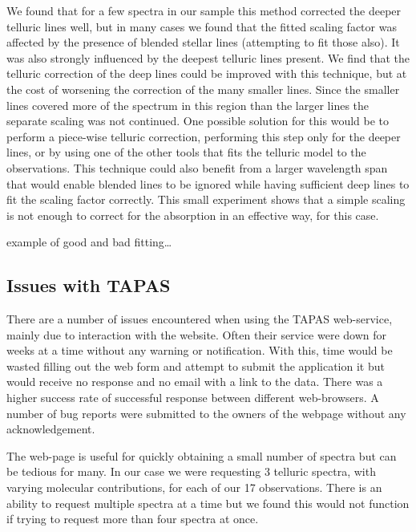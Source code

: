 We found that for a few spectra in our sample this method corrected the deeper telluric lines well, but in many cases we found that the fitted scaling factor was affected by the presence of blended stellar lines (attempting to fit those also).
It was also strongly influenced by the deepest   telluric lines present.
We find that the telluric correction of the deep  lines could be improved with this technique, but at the cost of worsening the correction of the many smaller  lines.
Since the smaller  lines covered more of the spectrum in this region than the larger lines the separate  scaling was not continued.
One possible solution for this would be to perform a piece-wise telluric correction, performing this step only for the deeper  lines, or by using one of the other tools that fits the telluric model to the observations.
This technique could also benefit from a larger wavelength span that would enable blended lines to be ignored while having sufficient deep  lines to fit the scaling factor correctly.
This small experiment shows that a simple scaling is not enough to correct for the absorption in an effective way, for this case.


 example of good and bad fitting\ldots



\subsection{Issues with {TAPAS}}
There are a number of issues encountered when using the {TAPAS} web-service, mainly due to interaction with the website.
Often their service were down for weeks at a time without any warning or notification.
With this, time would be wasted filling out the web form and attempt to submit the application it but would receive no response and no email with a link to the data.
There was a higher success rate of successful response between different web-browsers.
A number of bug reports were submitted to the owners of the webpage without any acknowledgement.

The web-page is useful for quickly obtaining a small number of spectra but can be tedious for many.
In our case we were requesting 3 telluric spectra, with varying molecular contributions, for each of our 17 observations.
There is an ability to request multiple spectra at a time but we found this would not function if trying to request more than four spectra at once.

